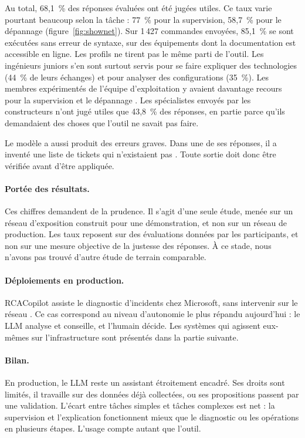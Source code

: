 Au total, 68,1~\% des réponses évaluées ont été jugées utiles. Ce taux varie pourtant beaucoup selon la tâche : 77~\% pour la supervision, 58,7~\% pour le dépannage (figure~\ref{fig:shownet}). Sur 1\,427 commandes envoyées, 85,1~\% se sont exécutées sans erreur de syntaxe, sur des équipements dont la documentation est accessible en ligne. Les profils ne tirent pas le même parti de l'outil. Les ingénieurs juniors s'en sont surtout servis pour se faire expliquer des technologies (44~\% de leurs échanges) et pour analyser des configurations (35~\%). Les membres expérimentés de l'équipe d'exploitation y avaient davantage recours pour la supervision et le dépannage \cite{nakamura2026}. Les spécialistes envoyés par les constructeurs n'ont jugé utiles que 43,8~\% des réponses, en partie parce qu'ils demandaient des choses que l'outil ne savait pas faire.

Le modèle a aussi produit des erreurs graves. Dans une de ses réponses, il a inventé une liste de tickets qui n'existaient pas \cite{nakamura2026}. Toute sortie doit donc être vérifiée avant d'être appliquée.

\paragraph{Portée des résultats.}
Ces chiffres demandent de la prudence. Il s'agit d'une seule étude, menée sur un réseau d'exposition construit pour une démonstration, et non sur un réseau de production. Les taux reposent sur des évaluations données par les participants, et non sur une mesure objective de la justesse des réponses. À ce stade, nous n'avons pas trouvé d'autre étude de terrain comparable.

\paragraph{Déploiements en production.}
RCACopilot assiste le diagnostic d'incidents chez Microsoft, sans intervenir sur le réseau \cite{chen2024}. Ce cas correspond au niveau d'autonomie le plus répandu aujourd'hui : le LLM analyse et conseille, et l'humain décide. Les systèmes qui agissent eux-mêmes sur l'infrastructure sont présentés dans la partie suivante.

\paragraph{Bilan.}
En production, le LLM reste un assistant étroitement encadré. Ses droits sont limités, il travaille sur des données déjà collectées, ou ses propositions passent par une validation. L'écart entre tâches simples et tâches complexes est net : la supervision et l'explication fonctionnent mieux que le diagnostic ou les opérations en plusieurs étapes. L'usage compte autant que l'outil.

